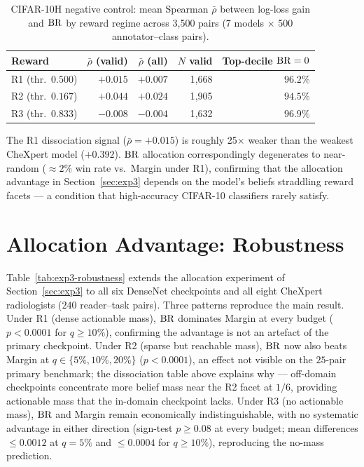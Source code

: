 \begin{table}[ht]
\centering
\caption{CIFAR-10H negative control: mean Spearman $\bar\rho$ between log-loss gain and $\operatorname{BR}$ by reward regime across 3{,}500 pairs (7 models $\times$ 500 annotator--class pairs).}
\label{tab:cifar10h}
\small
\begin{tabular}{@{}lrrrr@{}}
\toprule
Reward & $\bar\rho$ (valid) & $\bar\rho$ (all) & $N$ valid & Top-decile $\operatorname{BR}=0$ \\
\midrule
R1 (thr.\ $0.500$) & $+0.015$ & $+0.007$ & 1{,}668 & $96.2\%$ \\
R2 (thr.\ $0.167$) & $+0.044$ & $+0.024$ & 1{,}905 & $94.5\%$ \\
R3 (thr.\ $0.833$) & $-0.008$ & $-0.004$ & 1{,}632 & $96.9\%$ \\
\bottomrule
\end{tabular}
\end{table}

The R1 dissociation signal ($\bar\rho=+0.015$) is roughly 25$\times$ weaker than the weakest CheXpert model ($+0.392$).
$\operatorname{BR}$ allocation correspondingly degenerates to near-random (${\approx}2\%$ win rate vs.\ Margin under R1), confirming that the allocation advantage in Section~\ref{sec:exp3} depends on the model's beliefs straddling reward facets --- a condition that high-accuracy CIFAR-10 classifiers rarely satisfy.

\section{Allocation Advantage: Robustness}
\label{app:exp3-robustness}

Table~\ref{tab:exp3-robustness} extends the allocation experiment of Section~\ref{sec:exp3} to all six DenseNet checkpoints and all eight CheXpert radiologists ($240$ reader--task pairs).
Three patterns reproduce the main result.
Under R1 (dense actionable mass), $\operatorname{BR}$ dominates Margin at every budget ($p<0.0001$ for $q\geq 10\%$), confirming the advantage is not an artefact of the primary checkpoint.
Under R2 (sparse but reachable mass), $\operatorname{BR}$ now also beats Margin at $q\in\{5\%,10\%,20\%\}$ ($p<0.0001$), an effect not visible on the $25$-pair primary benchmark; the dissociation table above explains why --- off-domain checkpoints concentrate more belief mass near the R2 facet at $1/6$, providing actionable mass that the in-domain checkpoint lacks.
Under R3 (no actionable mass), $\operatorname{BR}$ and Margin remain economically indistinguishable, with no systematic advantage in either direction (sign-test $p \geq 0.08$ at every budget; mean differences $\leq 0.0012$ at $q=5\%$ and $\leq 0.0004$ for $q \geq 10\%$), reproducing the no-mass prediction.

